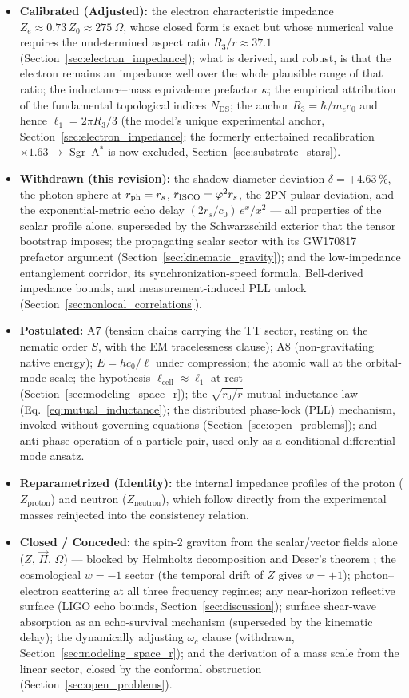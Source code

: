 \documentclass[11pt,a4paper]{article}
\theoremstyle{plain}
\theoremstyle{remark}
\newcommand{\Ncd}{\ensuremath{N_{\mathrm{DS}}}}
\begin{document}
\begin{itemize}
    \item \textbf{Calibrated (Adjusted):} the electron characteristic impedance $Z_e \approx 0.73\,Z_0 \approx 275~\Omega$, whose closed form is exact but whose numerical value requires the undetermined aspect ratio $R_3/r \approx 37.1$ (Section~\ref{sec:electron_impedance}); what is derived, and robust, is that the electron remains an impedance well over the whole plausible range of that ratio; the inductance--mass equivalence prefactor $\kappa$; the empirical attribution of the fundamental topological indices $\Ncd$; the anchor $R_3 = \hbar/m_e c_0$ and hence $\ell_1 = 2\pi R_3/3$ (the model's unique experimental anchor, Section~\ref{sec:electron_impedance}; the formerly entertained recalibration $\times1.63 \to$ Sgr~A$^*$ is now excluded, Section~\ref{sec:substrate_stars}).
    \item \textbf{Withdrawn (this revision):} the shadow-diameter deviation $\delta = +4.63\,\%$, the photon sphere at $r_{\rm ph} = r_s$, $r_{\rm ISCO} = \varphi^2 r_s$, the 2PN pulsar deviation, and the exponential-metric echo delay $(2r_s/c_0)\,e^x/x^2$ --- all properties of the scalar profile alone, superseded by the Schwarzschild exterior that the tensor bootstrap imposes; the propagating scalar sector with its GW170817 prefactor argument (Section~\ref{sec:kinematic_gravity}); and the low-impedance entanglement corridor, its synchronization-speed formula, Bell-derived impedance bounds, and measurement-induced PLL unlock (Section~\ref{sec:nonlocal_correlations}).
    \item \textbf{Postulated:} A7 (tension chains carrying the TT sector, resting on the nematic order $S$, with the EM tracelessness clause); A8 (non-gravitating native energy); $E = hc_0/\ell$ under compression; the atomic wall at the orbital-mode scale; the hypothesis $\ell_{\text{cell}} \approx \ell_1$ at rest (Section~\ref{sec:modeling_space_r}); the $\sqrt{r_0/r}$ mutual-inductance law (Eq.~\ref{eq:mutual_inductance}); the distributed phase-lock (PLL) mechanism, invoked without governing equations (Section~\ref{sec:open_problems}); and anti-phase operation of a particle pair, used only as a conditional differential-mode ansatz.
    \item \textbf{Reparametrized (Identity):} the internal impedance profiles of the proton ($Z_{\text{proton}}$) and neutron ($Z_{\text{neutron}}$), which follow directly from the experimental masses reinjected into the consistency relation.
    \item \textbf{Closed / Conceded:} the spin-2 graviton from the scalar/vector fields alone ($Z$, $\vec{\Pi}$, $\Omega$) --- blocked by Helmholtz decomposition and Deser's theorem \cite{deser1970}; the cosmological $w = -1$ sector (the temporal drift of $Z$ gives $w = +1$); photon--electron scattering at all three frequency regimes; any near-horizon reflective surface (LIGO echo bounds, Section~\ref{sec:discussion}); surface shear-wave absorption as an echo-survival mechanism (superseded by the kinematic delay); the dynamically adjusting $\omega_c$ clause (withdrawn, Section~\ref{sec:modeling_space_r}); and the derivation of a mass scale from the linear sector, closed by the conformal obstruction (Section~\ref{sec:open_problems}).

\end{itemize}
\end{document}
